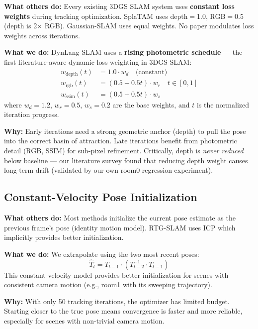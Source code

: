 \documentclass[10pt,twocolumn]{article}
\begin{document}
\textbf{What others do:} Every existing 3DGS SLAM system uses \textbf{constant loss weights} during tracking optimization. SplaTAM uses depth$=$1.0, RGB$=$0.5 (depth is 2$\times$ RGB). Gaussian-SLAM uses equal weights. No paper modulates loss weights across iterations.

\textbf{What we do:} DynLang-SLAM uses a \textcolor{ours}{\textbf{rising photometric schedule}} --- the first literature-aware dynamic loss weighting in 3DGS SLAM:
\begin{align}
w_{\text{depth}}(t) &= 1.0 \cdot w_d \quad \text{(constant)} \\
w_{\text{rgb}}(t) &= (0.5 + 0.5t) \cdot w_r \quad t \in [0, 1] \\
w_{\text{ssim}}(t) &= (0.5 + 0.5t) \cdot w_s
\end{align}
where $w_d = 1.2$, $w_r = 0.5$, $w_s = 0.2$ are the base weights, and $t$ is the normalized iteration progress.

\textbf{Why:} Early iterations need a strong geometric anchor (depth) to pull the pose into the correct basin of attraction. Late iterations benefit from photometric detail (RGB, SSIM) for sub-pixel refinement. Critically, depth is \textit{never reduced} below baseline --- our literature survey found that reducing depth weight causes long-term drift (validated by our own room0 regression experiment).

\subsection{Constant-Velocity Pose Initialization}

\textbf{What others do:} Most methods initialize the current pose estimate as the previous frame's pose (identity motion model). RTG-SLAM uses ICP which implicitly provides better initialization.

\textbf{What we do:} We extrapolate using the two most recent poses:
\begin{equation}
\hat{T}_t = T_{t-1} \cdot (T_{t-2}^{-1} \cdot T_{t-1})
\end{equation}
This constant-velocity model provides better initialization for scenes with consistent camera motion (e.g., room1 with its sweeping trajectory).

\textbf{Why:} With only 50 tracking iterations, the optimizer has limited budget. Starting closer to the true pose means convergence is faster and more reliable, especially for scenes with non-trivial camera motion.
\end{document}
